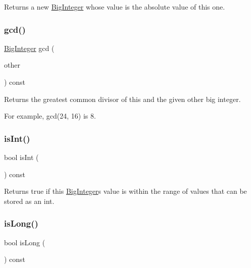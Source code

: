 Returns a new \mbox{\hyperlink{classBigInteger}{Big\+Integer}} whose value is the absolute value of this one. 

\mbox{\label{classBigInteger_a7863ef61a27a110c2971b0011ebd74b9}} 
\subsubsection{\texorpdfstring{gcd()}{gcd()}}
{\footnotesize\ttfamily \mbox{\hyperlink{classBigInteger}{Big\+Integer}} gcd (\begin{DoxyParamCaption}\item[{const \mbox{\hyperlink{classBigInteger}{Big\+Integer}} \&}]{other }\end{DoxyParamCaption}) const}



Returns the greatest common divisor of this and the given other big integer. 

For example, gcd(24, 16) is 8. \mbox{\label{classBigInteger_a772efbf9d46b2e1e3840763a76307040}} 
\subsubsection{\texorpdfstring{is\+Int()}{isInt()}}
{\footnotesize\ttfamily bool is\+Int (\begin{DoxyParamCaption}{ }\end{DoxyParamCaption}) const}



Returns true if this \mbox{\hyperlink{classBigInteger}{Big\+Integer}}\textquotesingle{}s value is within the range of values that can be stored as an int. 

\mbox{\label{classBigInteger_ae7ab3b45a738cd32270fcdea36953c7b}} 
\subsubsection{\texorpdfstring{is\+Long()}{isLong()}}
{\footnotesize\ttfamily bool is\+Long (\begin{DoxyParamCaption}{ }\end{DoxyParamCaption}) const}



